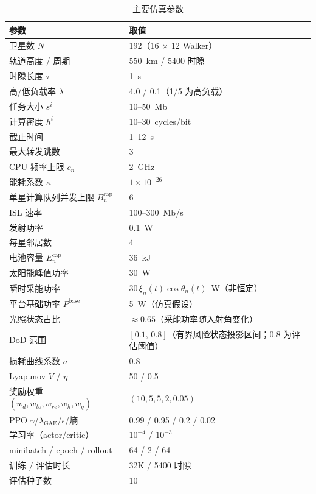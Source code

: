 \documentclass[a4paper,11pt]{article}
\begin{document}
\begin{table}[t]
\centering
\caption{主要仿真参数}
\label{tab:sim_params}
\begin{tabular}{ll}
\hline
参数 & 取值 \\
\hline
卫星数 $N$ & 192（16 $\times$ 12 Walker）\\
轨道高度 / 周期 & 550~km / 5400 时隙 \\
时隙长度 $\tau$ & 1~s \\
高/低负载率 $\lambda$ & 4.0 / 0.1（1/5 为高负载）\\
任务大小 $s^i$ & 10--50~Mb \\
计算密度 $h^i$ & 10--30~cycles/bit~\cite{zhang2024mhspo} \\
截止时间 & 1--12~s \\
最大转发跳数 & 3 \\
CPU 频率上限 $c_n$ & 2~GHz~\cite{zhang2024mhspo} \\
能耗系数 $\kappa$ & $1\times10^{-26}$~\cite{zhang2024mhspo} \\
单星计算队列并发上限 $B^{\mathrm{cap}}_n$ & 6 \\
ISL 速率 & 100--300~Mb/s \\
发射功率 & 0.1~W \\
每星邻居数 & 4 \\
电池容量 $E^{\mathrm{cap}}_n$ & 36~kJ \\
太阳能峰值功率 & 30~W \\
瞬时采能功率 & $30\,\xi_n(t)\cos\theta_n(t)$~W（非恒定）\\
平台基础功率 $P^{\mathrm{base}}$ & 5~W（仿真假设）\\
光照状态占比 & $\approx 0.65$（采能功率随入射角变化）\\
DoD 范围 & $[0.1,\,0.8]$（有界风险状态投影区间；0.8 为评估阈值）\\
损耗曲线系数 $a$ & 0.8 \\
Lyapunov $V$ / $\eta$ & 50 / 0.5 \\
奖励权重 $(w_d,w_{to},w_{re},w_h,w_q)$ & $(10,5,5,2,0.05)$ \\
PPO $\gamma$/$\lambda_{\text{GAE}}$/$\epsilon$/熵 & 0.99 / 0.95 / 0.2 / 0.02 \\
学习率（actor/critic） & $10^{-4}$ / $10^{-3}$ \\
minibatch / epoch / rollout & 64 / 2 / 64 \\
训练 / 评估时长 & 32K / 5400 时隙 \\
评估种子数 & 10 \\
\hline
\end{tabular}
\end{table}
\end{document}
